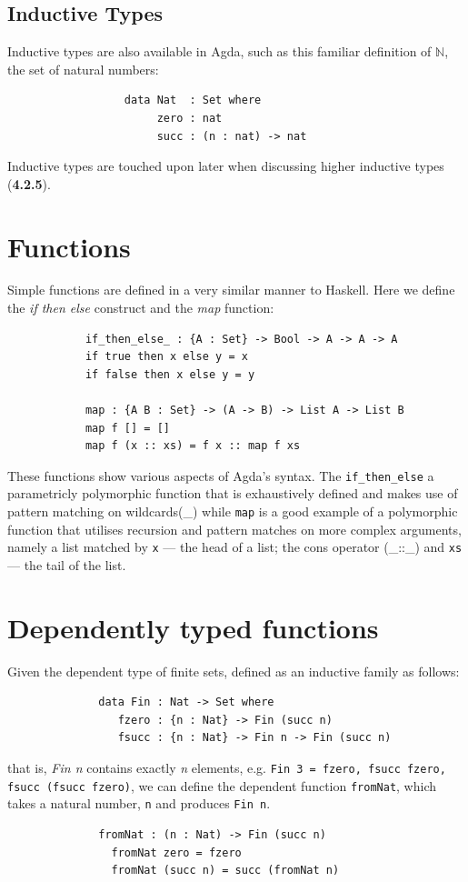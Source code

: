 \documentclass[12pt]{report}
\begin{document}
\subsection{Inductive Types}
Inductive types are also available in Agda, such as this familiar definition of $\mathbb{N}$, the set of natural numbers:
\begin{verbatim}
                  data Nat  : Set where
                       zero : nat
                       succ : (n : nat) -> nat
\end{verbatim}
Inductive types are touched upon later when discussing higher inductive types (\textbf{4.2.5}).

\section{Functions}
Simple functions are defined in a very similar manner to Haskell. Here we define the \textit{if then else} construct and the \textit{map} function: 
\begin{verbatim}
            if_then_else_ : {A : Set} -> Bool -> A -> A -> A
            if true then x else y = x  
            if false then x else y = y
                        
            map : {A B : Set} -> (A -> B) -> List A -> List B
            map f [] = []
            map f (x :: xs) = f x :: map f xs        
\end{verbatim}
These functions show various aspects of Agda's syntax. The \texttt{if\_then\_else} a parametricly polymorphic function that  is exhaustively defined and makes use of pattern matching on wildcards(\_) while \texttt{map} is a good example of a polymorphic function that utilises recursion and pattern matches on more complex arguments, namely a list matched by \texttt{x} --- the head of a list; the cons operator (\_::\_) and \texttt{xs} --- the tail of the list.

\section{Dependently typed functions}
Given the dependent type of finite sets, defined as an inductive family as follows:
\begin{verbatim}
              data Fin : Nat -> Set where
                 fzero : {n : Nat} -> Fin (succ n)
                 fsucc : {n : Nat} -> Fin n -> Fin (succ n)
\end{verbatim}
that is, \textit{Fin n} contains exactly \textit{n} elements, e.g. \texttt{Fin 3 = fzero, fsucc fzero, fsucc (fsucc fzero)}, we can define the dependent function \texttt{fromNat}, which takes a natural number, \texttt{n} and produces \texttt{Fin n}.
\begin{verbatim}
              fromNat : (n : Nat) -> Fin (succ n)
                fromNat zero = fzero  
                fromNat (succ n) = succ (fromNat n)
\end{verbatim}
\end{document}
